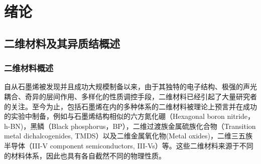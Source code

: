 \chapter{绪\hspace{6pt}论}

\section{二维材料及其异质结概述}
\subsection{二维材料概述}
    自从石墨烯被发现并且成功大规模制备以来，由于其独特的电子结构、极强的声光耦合、奇异的层间作用、多样化的性质调控手段，二维材料已经引起了大量研究者的关注。至今为止，包括石墨烯在内的多种体系的二维材料被理论上预言并在成功的实验中制备，例如与石墨烯结构相似的六方氮化硼（Hexagonal boron nitride，h-BN)，黑鳞（Black phosphorus，BP），二维过渡族金属硫族化合物（Transition metal dichalcogenides, TMDS）以及二维金属氧化物(Metal oxides)，二维三五族半导体（III-V component semiconductors, III-Vs）等。这些二维材料来源于不同的材料体系，因此也具有各自截然不同的物理性质。%

